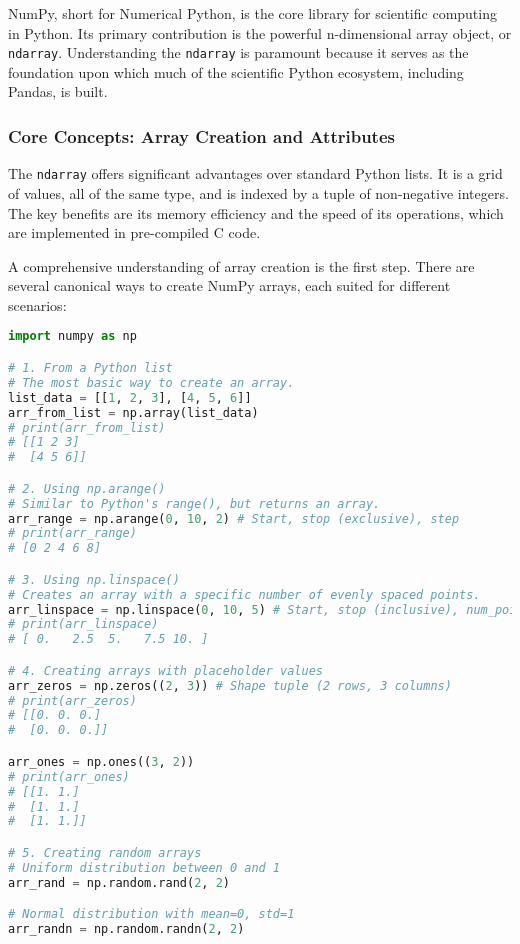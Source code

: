 \documentclass[11pt,a4paper]{article}
\begin{document}
NumPy, short for Numerical Python, is the core library for scientific computing in Python. Its primary contribution is the powerful n-dimensional array object, or \texttt{ndarray}. Understanding the \texttt{ndarray} is paramount because it serves as the foundation upon which much of the scientific Python ecosystem, including Pandas, is built.

\subsubsection{Core Concepts: Array Creation and Attributes}

The \texttt{ndarray} offers significant advantages over standard Python lists. It is a grid of values, all of the same type, and is indexed by a tuple of non-negative integers. The key benefits are its memory efficiency and the speed of its operations, which are implemented in pre-compiled C code.

A comprehensive understanding of array creation is the first step. There are several canonical ways to create NumPy arrays, each suited for different scenarios:

\begin{lstlisting}[language=Python]
import numpy as np

# 1. From a Python list
# The most basic way to create an array.
list_data = [[1, 2, 3], [4, 5, 6]]
arr_from_list = np.array(list_data)
# print(arr_from_list)
# [[1 2 3]
#  [4 5 6]]

# 2. Using np.arange()
# Similar to Python's range(), but returns an array.
arr_range = np.arange(0, 10, 2) # Start, stop (exclusive), step
# print(arr_range)
# [0 2 4 6 8]

# 3. Using np.linspace()
# Creates an array with a specific number of evenly spaced points.
arr_linspace = np.linspace(0, 10, 5) # Start, stop (inclusive), num_points
# print(arr_linspace)
# [ 0.   2.5  5.   7.5 10. ]

# 4. Creating arrays with placeholder values
arr_zeros = np.zeros((2, 3)) # Shape tuple (2 rows, 3 columns)
# print(arr_zeros)
# [[0. 0. 0.]
#  [0. 0. 0.]]

arr_ones = np.ones((3, 2))
# print(arr_ones)
# [[1. 1.]
#  [1. 1.]
#  [1. 1.]]

# 5. Creating random arrays
# Uniform distribution between 0 and 1
arr_rand = np.random.rand(2, 2)

# Normal distribution with mean=0, std=1
arr_randn = np.random.randn(2, 2)
\end{lstlisting}
\end{document}
